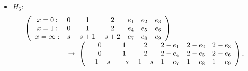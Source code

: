 \documentclass[a4paper,12pt]{article}
\theoremstyle{definition}
\theoremstyle{remark}
\numberwithin{equation}{section} %
\def\comment#1{ }
\begin{document}
\begin{itemize}
\item  $H_6$:
  \[
  \begin{array}{l}
    \left(\begin{array}{ccccccccc}
x=0:&0&1&2&e_1&e_2&e_3\\
x=1:&0&1&2&e_4&e_5&e_6\\
x=\infty:&s&\ s+1\ &s+2&e_7&e_8&e_9\end{array}\right)
\\
\hskip60pt
\to\ \left(\begin{array}{cccccccc}
0&1&2&2-e_1&2-e_2&2-e_3\\
0&1&2&2-e_4&2-e_5&2-e_6\\
-1-s&\ -s\ &1-s&1-e_7&1-e_8&1-e_9\end{array}\right),
  \end{array}
  \]
  
  \comment{
  $S\!E_6$:
  $$S\!E_6^*(a,b,c,g,p,q,r)=S\!E_6( -a - 1, -b - 1, -c - 1, -g, -p - 1, -q - 1, 1 - r).$$
  }


\end{itemize}
\end{document}
